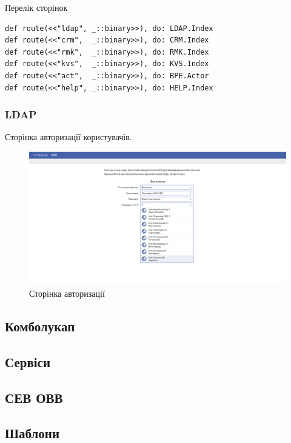 Перелік сторінок

\begin{lstlisting}
def route(<<"ldap", _::binary>>), do: LDAP.Index
def route(<<"crm",  _::binary>>), do: CRM.Index
def route(<<"rmk",  _::binary>>), do: RMK.Index
def route(<<"kvs",  _::binary>>), do: KVS.Index
def route(<<"act",  _::binary>>), do: BPE.Actor
def route(<<"help", _::binary>>), do: HELP.Index
\end{lstlisting}

\subsubsection{LDAP}

Сторінка авторизації користувачів.

\begin{figure}[!htbp]
\centerline{\includegraphics[scale=0.25]{LDAP.PNG}}
\caption{Сторінка авторизації}
\end{figure}

\subsection{Комболукап}

\subsection{Сервіси}

\subsection{СЕВ ОВВ}

\subsection{Шаблони}

